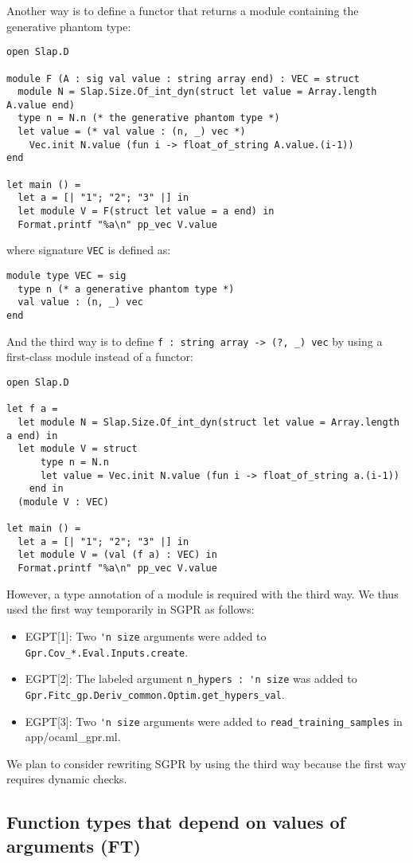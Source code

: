 \documentclass[10pt,a4paper]{article}
\begin{document}
Another way is to define a functor that returns a module containing the
generative phantom type:
\begin{lstlisting}
open Slap.D

module F (A : sig val value : string array end) : VEC = struct
  module N = Slap.Size.Of_int_dyn(struct let value = Array.length A.value end)
  type n = N.n (* the generative phantom type *)
  let value = (* val value : (n, _) vec *)
    Vec.init N.value (fun i -> float_of_string A.value.(i-1))
end

let main () =
  let a = [| "1"; "2"; "3" |] in
  let module V = F(struct let value = a end) in
  Format.printf "%a\n" pp_vec V.value
\end{lstlisting}
where signature \lstinline|VEC| is defined as:
\begin{lstlisting}
module type VEC = sig
  type n (* a generative phantom type *)
  val value : (n, _) vec
end
\end{lstlisting}
And the third way is to define \lstinline|f : string array -> (?, _) vec| by using
a first-class module instead of a functor:
\begin{lstlisting}
open Slap.D

let f a =
  let module N = Slap.Size.Of_int_dyn(struct let value = Array.length a end) in
  let module V = struct
      type n = N.n
      let value = Vec.init N.value (fun i -> float_of_string a.(i-1))
    end in
  (module V : VEC)

let main () =
  let a = [| "1"; "2"; "3" |] in
  let module V = (val (f a) : VEC) in
  Format.printf "%a\n" pp_vec V.value
\end{lstlisting}
However, a type annotation of a module is required with the third way.
We thus used the first way temporarily in SGPR as follows:
\begin{itemize}
\item EGPT[1]: Two \lstinline|'n size| arguments were added to
  \lstinline|Gpr.Cov_*.Eval.Inputs.create|.
\item EGPT[2]: The labeled argument \lstinline|n_hypers : 'n size|
  was added to \lstinline|Gpr.Fitc_gp.Deriv_common.Optim.get_hypers_val|.
\item EGPT[3]: Two \lstinline|'n size| arguments were added to
  \lstinline|read_training_samples| in app/ocaml\_gpr.ml.
\end{itemize}
We plan to consider rewriting SGPR by using the third way because the first way
requires dynamic checks.

\subsection{Function types that depend on values of arguments (FT)}
\label{sec:FT}
\end{document}
